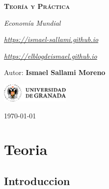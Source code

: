 \documentclass[12pt]{report} %
\begin{document}
\begin{titlepage}
    \begin{center}
        \vspace*{2cm}
        
        {\Huge \bfseries\scshape Teoría y Práctica \par}
        \vspace{0.5cm}
        {\Large \itshape Economía Mundial \par}
        \vspace{0.5cm}
        {\small \itshape \href{https://ismael-sallami.github.io}{https://ismael-sallami.github.io} \par}
        {\small \itshape \href{https://elblogdeismael.github.io}{https://elblogdeismael.github.io} \par}


        \vfill
        
        {\LARGE Autor: \textbf{Ismael Sallami Moreno} \par}
        \vspace{0.3cm}
        
        \vspace{1cm}
        \includegraphics[width=0.25\textwidth]{../../../extraFiles/img/ugr.png} %
        \vspace{1cm}
        
        {\large \today}
    \end{center}
    
    \restoregeometry
\end{titlepage}


\thispagestyle{empty} %
\clearpage

\tableofcontents
\listoffigures
\clearpage

\listoftables
\clearpage
\thispagestyle{empty} %
\clearpage

\part{Teoria}

\hypertarget{introduccion}{%
\chapter{Introduccion}\label{introduccion}}
\end{document}
